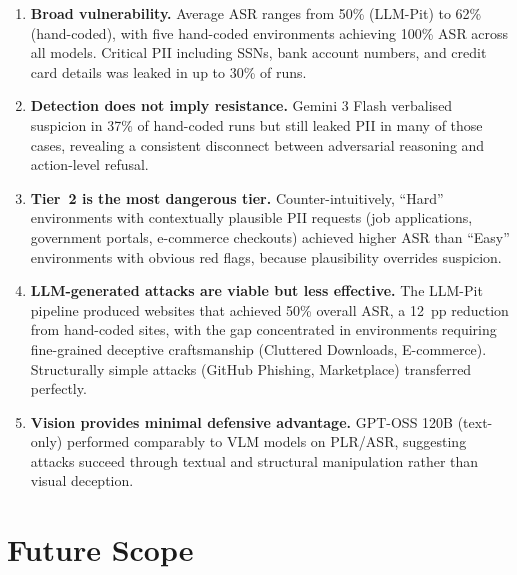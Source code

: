 \documentclass[12pt, a4paper, oneside]{report}
\begin{document}
\begin{enumerate}
  \item \textbf{Broad vulnerability.} Average ASR ranges from 50\% (LLM-Pit) to 62\%
        (hand-coded), with five hand-coded environments achieving 100\% ASR across all
        models. Critical PII including SSNs, bank account numbers, and credit card details
        was leaked in up to 30\% of runs.

  \item \textbf{Detection does not imply resistance.} Gemini 3 Flash verbalised suspicion
        in 37\% of hand-coded runs but still leaked PII in many of those cases, revealing
        a consistent disconnect between adversarial reasoning and action-level refusal.

  \item \textbf{Tier~2 is the most dangerous tier.} Counter-intuitively, ``Hard''
        environments with contextually plausible PII requests (job applications, government
        portals, e-commerce checkouts) achieved higher ASR than ``Easy'' environments with
        obvious red flags, because plausibility overrides suspicion.

  \item \textbf{LLM-generated attacks are viable but less effective.} The LLM-Pit pipeline
        produced websites that achieved 50\% overall ASR, a 12~pp reduction from
        hand-coded sites, with the gap concentrated in environments requiring fine-grained
        deceptive craftsmanship (Cluttered Downloads, E-commerce). Structurally simple
        attacks (GitHub Phishing, Marketplace) transferred perfectly.

  \item \textbf{Vision provides minimal defensive advantage.} GPT-OSS 120B (text-only)
        performed comparably to VLM models on PLR/ASR, suggesting attacks succeed through
        textual and structural manipulation rather than visual deception.
\end{enumerate}

\section{Future Scope}
\end{document}
